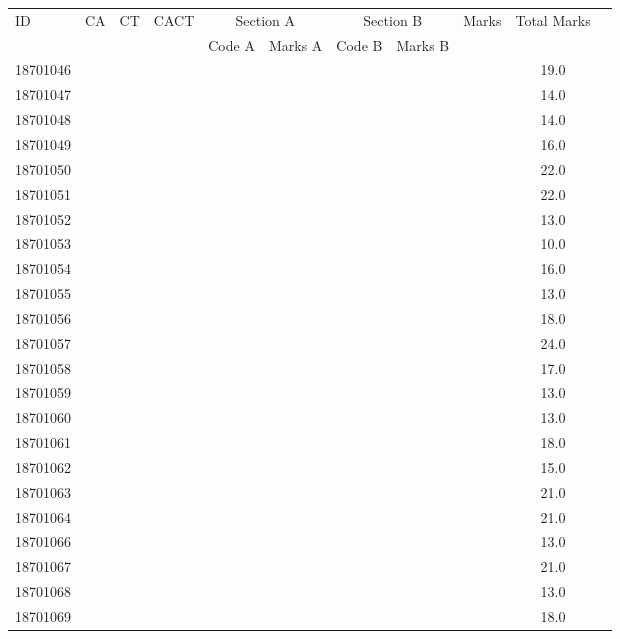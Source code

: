 \documentclass[12pt]{article}
\begin{document}
    \begin{center} 
	\renewcommand{\arraystretch}{1.08}
	\begin{small}
    \begin{tabular}{|l|c|c|c|c|c|c|c|c|c|c|} \hline
	\multirow{2}{*}{ID} & 	\multirow{2}{*}{CA}  & 	\multirow{2}{*}{CT}  & 	\multirow{2}{*}{CACT}  & \multicolumn{2 }{c|}{Section A}& \multicolumn{2 }{c|}{Section B} & 	\multirow{2}{*}{Marks}  & 	\multirow{2}{*}{Total Marks}  \\ 
	&  &  &  & Code A & Marks A & Code B & Marks B&  &  \\ \hline
18701046 &  &  &  &  &  &  &  &  & 19.0\\ \hline 
18701047 &  &  &  &  &  &  &  &  & 14.0\\ \hline 
18701048 &  &  &  &  &  &  &  &  & 14.0\\ \hline 
18701049 &  &  &  &  &  &  &  &  & 16.0\\ \hline 
18701050 &  &  &  &  &  &  &  &  & 22.0\\ \hline 
18701051 &  &  &  &  &  &  &  &  & 22.0\\ \hline 
18701052 &  &  &  &  &  &  &  &  & 13.0\\ \hline 
18701053 &  &  &  &  &  &  &  &  & 10.0\\ \hline 
18701054 &  &  &  &  &  &  &  &  & 16.0\\ \hline 
18701055 &  &  &  &  &  &  &  &  & 13.0\\ \hline 
18701056 &  &  &  &  &  &  &  &  & 18.0\\ \hline 
18701057 &  &  &  &  &  &  &  &  & 24.0\\ \hline 
18701058 &  &  &  &  &  &  &  &  & 17.0\\ \hline 
18701059 &  &  &  &  &  &  &  &  & 13.0\\ \hline 
18701060 &  &  &  &  &  &  &  &  & 13.0\\ \hline 
18701061 &  &  &  &  &  &  &  &  & 18.0\\ \hline 
18701062 &  &  &  &  &  &  &  &  & 15.0\\ \hline 
18701063 &  &  &  &  &  &  &  &  & 21.0\\ \hline 
18701064 &  &  &  &  &  &  &  &  & 21.0\\ \hline 
18701066 &  &  &  &  &  &  &  &  & 13.0\\ \hline 
18701067 &  &  &  &  &  &  &  &  & 21.0\\ \hline 
18701068 &  &  &  &  &  &  &  &  & 13.0\\ \hline 
18701069 &  &  &  &  &  &  &  &  & 18.0\\ \hline 

\end{tabular}
\end{small}
\end{center}
\end{document}
